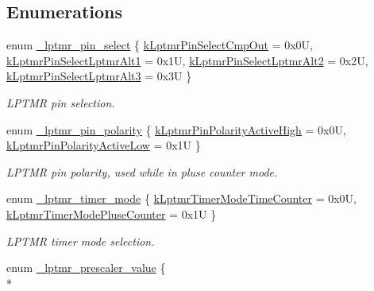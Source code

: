 \subsection*{Enumerations}
\begin{DoxyCompactItemize}
\item 
enum \hyperlink{group__lptmr__hal_gad7812eb27238f5bd2cb3edc40d5f25ed}{\+\_\+lptmr\+\_\+pin\+\_\+select} \{ \hyperlink{group__lptmr__hal_ggad7812eb27238f5bd2cb3edc40d5f25eda0019cfa3233b2ea349e4f543ac44ee5a}{k\+Lptmr\+Pin\+Select\+Cmp\+Out} = 0x0U, 
\hyperlink{group__lptmr__hal_ggad7812eb27238f5bd2cb3edc40d5f25edac9447cc172a7de06276986f458e1d729}{k\+Lptmr\+Pin\+Select\+Lptmr\+Alt1} = 0x1U, 
\hyperlink{group__lptmr__hal_ggad7812eb27238f5bd2cb3edc40d5f25edae2572e0cd4e75ff2b6b155c04037f5e5}{k\+Lptmr\+Pin\+Select\+Lptmr\+Alt2} = 0x2U, 
\hyperlink{group__lptmr__hal_ggad7812eb27238f5bd2cb3edc40d5f25eda52a84f12dd7cf864ccf82f982e5d23f6}{k\+Lptmr\+Pin\+Select\+Lptmr\+Alt3} = 0x3U
 \}\begin{DoxyCompactList}\small\item\em L\+P\+T\+MR pin selection. \end{DoxyCompactList}
\item 
enum \hyperlink{group__lptmr__hal_ga9bd2404c984ac5eea420a396e7cdda77}{\+\_\+lptmr\+\_\+pin\+\_\+polarity} \{ \hyperlink{group__lptmr__hal_gga9bd2404c984ac5eea420a396e7cdda77a7b21927f936e62d241563c96026d8207}{k\+Lptmr\+Pin\+Polarity\+Active\+High} = 0x0U, 
\hyperlink{group__lptmr__hal_gga9bd2404c984ac5eea420a396e7cdda77a17687aba3cde66c61aeebfc1e03990d1}{k\+Lptmr\+Pin\+Polarity\+Active\+Low} = 0x1U
 \}\begin{DoxyCompactList}\small\item\em L\+P\+T\+MR pin polarity, used while in pluse counter mode. \end{DoxyCompactList}
\item 
enum \hyperlink{group__lptmr__hal_ga40237256921d8a780c71b2f4ce162498}{\+\_\+lptmr\+\_\+timer\+\_\+mode} \{ \hyperlink{group__lptmr__hal_gga40237256921d8a780c71b2f4ce162498a5dcb0e199c223550172269115e137f53}{k\+Lptmr\+Timer\+Mode\+Time\+Counter} = 0x0U, 
\hyperlink{group__lptmr__hal_gga40237256921d8a780c71b2f4ce162498aeb8a50428ef5499dc3687371be59402a}{k\+Lptmr\+Timer\+Mode\+Pluse\+Counter} = 0x1U
 \}\begin{DoxyCompactList}\small\item\em L\+P\+T\+MR timer mode selection. \end{DoxyCompactList}
\item 
enum \hyperlink{group__lptmr__hal_ga74f514106ef3e5e8fdf0670a22937c68}{\+\_\+lptmr\+\_\+prescaler\+\_\+value} \{ \\*

\end{DoxyCompactItemize}
